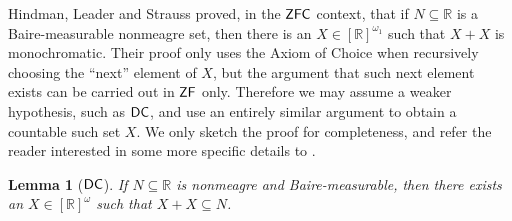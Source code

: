 \documentclass{amsart}
\newtheorem{lemma}[theorem]{Lemma}
\theoremstyle{definition}
\newcommand{\zf}{\mathnormal{\mathsf{ZF}}}
\newcommand{\dc}{\mathnormal{\mathsf{DC}}}
\newcommand{\zfc}{\mathnormal{\mathsf{ZFC}}}
\theoremstyle{remark}
\numberwithin{equation}{section}
\begin{document}
Hindman, Leader and Strauss \cite{HindmanLeaderStrauss2017} proved, in the $\zfc$ context, that if $N\subseteq\mathbb R$ is a Baire-measurable nonmeagre set, then there is an $X\in[\mathbb R]^{\omega_1}$ such that $X+X$ is monochromatic. Their proof only uses the Axiom of Choice when recursively choosing the ``next'' element of $X$, but the argument that such next element exists can be carried out in $\zf$ only. Therefore we may assume a weaker hypothesis, such as $\dc$, and use an entirely similar argument to obtain a countable such set $X$. We only sketch the proof for completeness, and refer the reader interested in some more specific details to \cite[Lemma 4.1 and Theorem 4.2]{HindmanLeaderStrauss2017}.





\begin{lemma}[$\dc$]\label{lem:hls}
If $N\subseteq\mathbb{R}$ is nonmeagre and Baire-measurable, then there exists an $X\in[\mathbb{R}]^{\omega}$ such that $X+X\subseteq N$.
\end{lemma}
\end{document}
